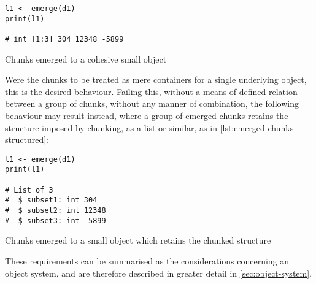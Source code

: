 \begin{listing}
    \begin{verbatim}
l1 <- emerge(d1)
print(l1)

# int [1:3] 304 12348 -5899
\end{verbatim}
    \caption{Chunks emerged to a cohesive small object}
    \label{lst:emerged-chunks}
\end{listing}

Were the chunks to be treated as mere containers for a single underlying
object, this is the desired behaviour. Failing this, without a means of
defined relation between a group of chunks, without any manner of
combination, the following behaviour may result instead, where a group
of emerged chunks retains the structure imposed by chunking, as a list
or similar, as in \cref{lst:emerged-chunks-structured}:

\begin{listing}
    \begin{verbatim}
l1 <- emerge(d1)
print(l1)

# List of 3
#  $ subset1: int 304
#  $ subset2: int 12348
#  $ subset3: int -5899
\end{verbatim}
    \caption{Chunks emerged to a small object which retains the chunked structure}
    \label{lst:emerged-chunks-structured}
\end{listing}

These requirements can be summarised as the considerations concerning an
object system, and are therefore described in greater detail in
\cref{sec:object-system}.